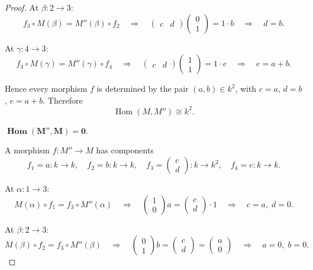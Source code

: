 \documentclass[11pt, a4paper]{article}
\begin{document}
\begin{enumerate}[leftmargin=*, label=\textbf{\arabic*.}]
\begin{enumerate}[label=(\alph*)]
\begin{proof}
    At $\beta\colon 2\to 3$:
    \[
    f_3\circ M(\beta) = M''(\beta)\circ f_2 \quad\Longrightarrow\quad \begin{pmatrix}c&d\end{pmatrix}\begin{pmatrix}0\\1\end{pmatrix} = 1\cdot b \quad\Longrightarrow\quad d = b.
    \]
    
    At $\gamma\colon 4\to 3$:
    \[
    f_3\circ M(\gamma) = M''(\gamma)\circ f_4 \quad\Longrightarrow\quad \begin{pmatrix}c&d\end{pmatrix}\begin{pmatrix}1\\1\end{pmatrix} = 1\cdot e \quad\Longrightarrow\quad e = a+b.
    \]
    
    Hence every morphism $f$ is determined by the pair $(a,b)\in k^2$, with $c=a$, $d=b$, $e=a+b$. Therefore
    \[
    \operatorname{Hom}(M,M'') \cong k^2.
    \]

    \medskip\noindent$\boldsymbol{\operatorname{Hom}(M'',M)=0.}$
    
    A morphism $f\colon M''\to M$ has components
    \[
    f_1 = a\colon k\to k,\quad f_2 = b\colon k\to k,\quad f_3 = \begin{pmatrix}c\\d\end{pmatrix}\colon k\to k^2,\quad f_4 = e\colon k\to k.
    \]
    
    At $\alpha\colon 1\to 3$:
    \[
    M(\alpha)\circ f_1 = f_3\circ M''(\alpha) \quad\Longrightarrow\quad \begin{pmatrix}1\\0\end{pmatrix}a = \begin{pmatrix}c\\d\end{pmatrix}\cdot 1 \quad\Longrightarrow\quad c = a,\; d = 0.
    \]
    
    At $\beta\colon 2\to 3$:
    \[
    M(\beta)\circ f_2 = f_3\circ M''(\beta) \quad\Longrightarrow\quad \begin{pmatrix}0\\1\end{pmatrix}b = \begin{pmatrix}c\\d\end{pmatrix} = \begin{pmatrix}a\\0\end{pmatrix} \quad\Longrightarrow\quad a = 0,\; b = 0.
    \]
    

\end{proof}
\end{enumerate}
\end{enumerate}
\end{document}
